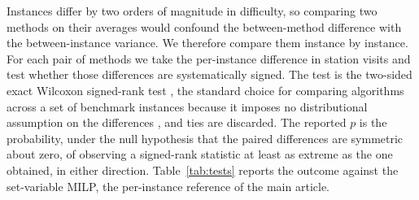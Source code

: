 \documentclass[11pt]{article}
\begin{document}
Instances differ by two orders of magnitude in difficulty, so comparing two methods on their
averages would confound the between-method difference with the between-instance variance. We
therefore compare them instance by instance. For each pair of methods we take the per-instance
difference in station visits and test whether those differences are systematically signed. The
test is the two-sided exact Wilcoxon signed-rank test \citep{wilcoxon1945}, the standard choice
for comparing algorithms across a set of benchmark instances because it imposes no
distributional assumption on the differences \citep{demsar2006}, and ties are discarded. The
reported $p$ is the probability, under the null hypothesis that the paired differences are
symmetric about zero, of observing a signed-rank statistic at least as extreme as the one
obtained, in either direction. Table~\ref{tab:tests} reports the outcome against the
set-variable MILP, the per-instance reference of the main article.
\end{document}
